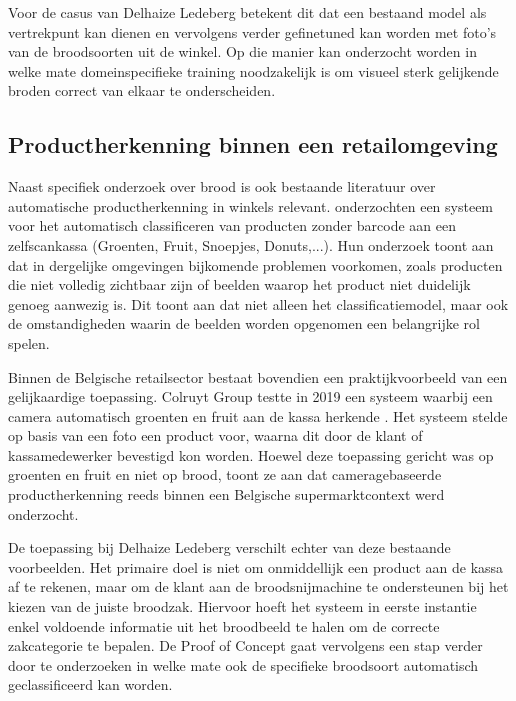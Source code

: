 Voor de casus van Delhaize Ledeberg betekent dit dat een bestaand model als vertrekpunt kan dienen en vervolgens verder gefinetuned kan worden met foto's van de broodsoorten uit de winkel. Op die manier kan onderzocht worden in welke mate domeinspecifieke training noodzakelijk is om visueel sterk gelijkende broden correct van elkaar te onderscheiden.

\subsection{Productherkenning binnen een retailomgeving}

Naast specifiek onderzoek over brood is ook bestaande literatuur over automatische productherkenning in winkels relevant. \textcite{Ciapas_2023} onderzochten een systeem voor het automatisch classificeren van producten zonder barcode aan een zelfscankassa (Groenten, Fruit, Snoepjes, Donuts,...). Hun onderzoek toont aan dat in dergelijke omgevingen bijkomende problemen voorkomen, zoals producten die niet volledig zichtbaar zijn of beelden waarop het product niet duidelijk genoeg aanwezig is. Dit toont aan dat niet alleen het classificatiemodel, maar ook de omstandigheden waarin de beelden worden opgenomen een belangrijke rol spelen.

Binnen de Belgische retailsector bestaat bovendien een praktijkvoorbeeld van een gelijkaardige toepassing. Colruyt Group testte in 2019 een systeem waarbij een camera automatisch groenten en fruit aan de kassa herkende \autocite{ColruytGroup2019}. Het systeem stelde op basis van een foto een product voor, waarna dit door de klant of kassamedewerker bevestigd kon worden. Hoewel deze toepassing gericht was op groenten en fruit en niet op brood, toont ze aan dat cameragebaseerde productherkenning reeds binnen een Belgische supermarktcontext werd onderzocht.

De toepassing bij Delhaize Ledeberg verschilt echter van deze bestaande voorbeelden. Het primaire doel is niet om onmiddellijk een product aan de kassa af te rekenen, maar om de klant aan de broodsnijmachine te ondersteunen bij het kiezen van de juiste broodzak. Hiervoor hoeft het systeem in eerste instantie enkel voldoende informatie uit het broodbeeld te halen om de correcte zakcategorie te bepalen. De Proof of Concept gaat vervolgens een stap verder door te onderzoeken in welke mate ook de specifieke broodsoort automatisch geclassificeerd kan worden.

